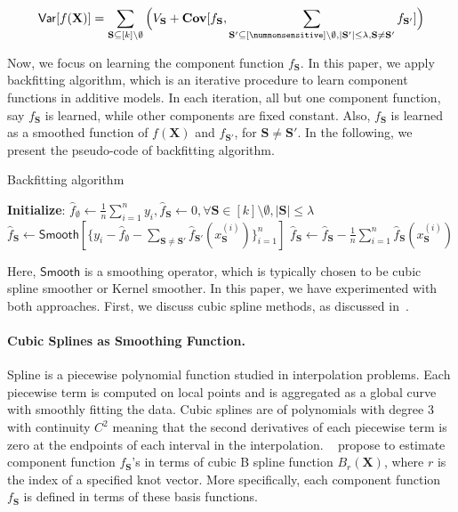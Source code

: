 \[
\mathsf{Var}[f(\mathbf{X})] = \sum_{\mathbf{S} \subseteq [k] \setminus \emptyset} \Big(V_{\mathbf{S}}  + \mathbf{Cov}[f_{\mathbf{S}}, \sum_{\mathbf{S}' \subseteq [\numnonsensitive] \setminus \emptyset, |\mathbf{S}'| \le \lambda, \mathbf{S} \ne \mathbf{S}'} f_{\mathbf{S}'}]\Big)
\]


Now, we focus on learning the component function $ f_{\mathbf{S}} $. In this paper, we apply backfitting algorithm, which is an iterative procedure to learn component functions in additive models. In each iteration, all but one component function, say $ f_{\mathbf{S}} $ is learned, while other components are fixed constant. Also, $ f_{\mathbf{S}} $ is learned as a smoothed function of $ f(\mathbf{X}) $ and $ f_{\mathbf{S}'} $, for $ \mathbf{S} \ne \mathbf{S}' $. In the following, we present the pseudo-code of backfitting algorithm. 

\begin{algorithm}
	\caption{Backfitting algorithm}
	\label{algo:iterative_decision_sets_learning}
	\begin{algorithmic}[1]
		\State \textbf{Initialize}: $ \hat{f}_{\emptyset} \leftarrow \frac{1}{n}\sum_{i=1}^ny_i, \hat{f}_{\mathbf{S}} \leftarrow 0, \forall \mathbf{S} \in [k]\setminus\emptyset, |\mathbf{S}|\le \lambda$ 
		\State $ \hat{f}_{\mathbf{S}} \leftarrow \mathsf{Smooth}[\{y_i - \hat{f}_{\emptyset} - \sum_{\mathbf{S} \ne \mathbf{S}'} \hat{f}_{\mathbf{S}'}(x_{\mathbf{S}}^{(i)})\}_{i=1}^n] $ 
		\State $\hat{f}_{\mathbf{S}}  \leftarrow \hat{f}_{\mathbf{S}} - \frac{1}{n}\sum_{i=1}^n \hat{f}_{\mathbf{S}}(x_{\mathbf{S}}^{(i)})$ 
		\EndFor
		\EndWhile
	\end{algorithmic}
\end{algorithm}

Here, $ \mathsf{Smooth} $ is a smoothing operator, which is typically chosen to be cubic spline smoother or Kernel smoother. In this paper, we have experimented with both approaches. First, we discuss cubic spline methods, as discussed in~\cite{li2010global}. 


\paragraph{Cubic Splines as Smoothing Function.} Spline is a piecewise polynomial function studied in interpolation problems. Each piecewise term is computed on local points and is aggregated as a global curve with smoothly fitting the data. Cubic splines are of polynomials with degree $ 3 $ with continuity $ C^2 $ meaning that the second derivatives of each piecewise term is zero at the endpoints of each interval in the interpolation. ~\cite{li2010global} propose to estimate component function $ f_{\mathbf{S}} $'s in terms of cubic B spline function $ B_r(\mathbf{X}) $, where $ r $ is the index of a specified knot vector. More specifically, each component function $ f_{\mathbf{S}} $ is defined in terms of these basis functions. 


